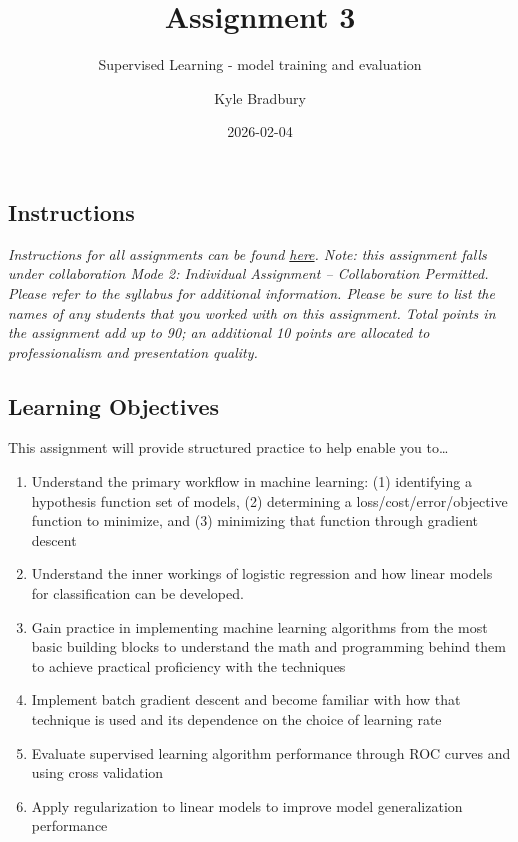 \documentclass[
  letterpaper,
  DIV=11,
  numbers=noendperiod]{scrartcl}
\title{Assignment 3}
\subtitle{Supervised Learning - model training and evaluation}
\author{Kyle Bradbury}
\date{2026-02-04}
\providecommand{\tightlist}{%
  \setlength{\itemsep}{0pt}\setlength{\parskip}{0pt}}\usepackage{longtable,booktabs,array}
\renewcommand*\contentsname{Table of contents}
\newcommand\contentsname{Table of contents}
\begin{document}
\maketitle

\renewcommand*\contentsname{Table of contents}
{
\hypersetup{linkcolor=}
\setcounter{tocdepth}{1}
\tableofcontents
}

\subsection{Instructions}\label{instructions}

\emph{Instructions for all assignments can be found
\href{https://kylebradbury.github.io/ids705/notebooks/assignment_instructions.html}{here}.
Note: this assignment falls under collaboration Mode 2: Individual
Assignment -- Collaboration Permitted. Please refer to the syllabus for
additional information. Please be sure to list the names of any students
that you worked with on this assignment. Total points in the assignment
add up to 90; an additional 10 points are allocated to professionalism
and presentation quality.}

\subsection{Learning Objectives}\label{learning-objectives}

This assignment will provide structured practice to help enable you
to\ldots{}

\begin{enumerate}
\def\labelenumi{\arabic{enumi}.}
\tightlist
\item
  Understand the primary workflow in machine learning: (1) identifying a
  hypothesis function set of models, (2) determining a
  loss/cost/error/objective function to minimize, and (3) minimizing
  that function through gradient descent
\item
  Understand the inner workings of logistic regression and how linear
  models for classification can be developed.
\item
  Gain practice in implementing machine learning algorithms from the
  most basic building blocks to understand the math and programming
  behind them to achieve practical proficiency with the techniques
\item
  Implement batch gradient descent and become familiar with how that
  technique is used and its dependence on the choice of learning rate
\item
  Evaluate supervised learning algorithm performance through ROC curves
  and using cross validation
\item
  Apply regularization to linear models to improve model generalization
  performance
\end{enumerate}
\end{document}
